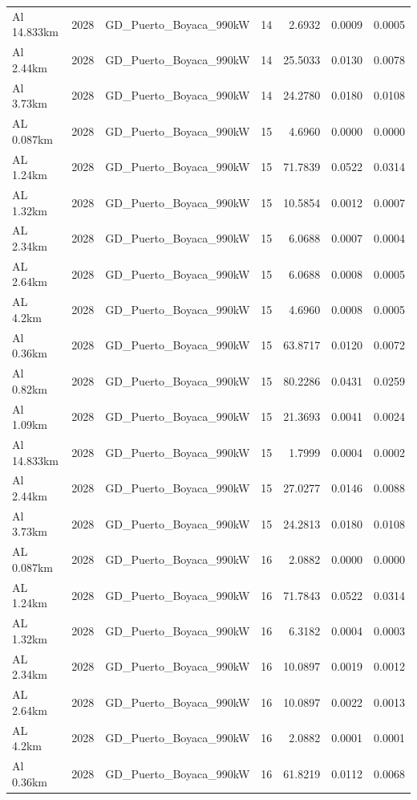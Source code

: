 \documentclass[11pt,a4paper]{article}
\begin{document}
\begin{longtable}{llllrrr}
Al 14.833km & 2028 & GD\_Puerto\_Boyaca\_990kW & 14 & 2.6932 & 0.0009 & 0.0005 \\
Al 2.44km & 2028 & GD\_Puerto\_Boyaca\_990kW & 14 & 25.5033 & 0.0130 & 0.0078 \\
Al 3.73km & 2028 & GD\_Puerto\_Boyaca\_990kW & 14 & 24.2780 & 0.0180 & 0.0108 \\
AL 0.087km & 2028 & GD\_Puerto\_Boyaca\_990kW & 15 & 4.6960 & 0.0000 & 0.0000 \\
AL 1.24km & 2028 & GD\_Puerto\_Boyaca\_990kW & 15 & 71.7839 & 0.0522 & 0.0314 \\
AL 1.32km & 2028 & GD\_Puerto\_Boyaca\_990kW & 15 & 10.5854 & 0.0012 & 0.0007 \\
AL 2.34km & 2028 & GD\_Puerto\_Boyaca\_990kW & 15 & 6.0688 & 0.0007 & 0.0004 \\
AL 2.64km & 2028 & GD\_Puerto\_Boyaca\_990kW & 15 & 6.0688 & 0.0008 & 0.0005 \\
AL 4.2km & 2028 & GD\_Puerto\_Boyaca\_990kW & 15 & 4.6960 & 0.0008 & 0.0005 \\
Al 0.36km & 2028 & GD\_Puerto\_Boyaca\_990kW & 15 & 63.8717 & 0.0120 & 0.0072 \\
Al 0.82km & 2028 & GD\_Puerto\_Boyaca\_990kW & 15 & 80.2286 & 0.0431 & 0.0259 \\
Al 1.09km & 2028 & GD\_Puerto\_Boyaca\_990kW & 15 & 21.3693 & 0.0041 & 0.0024 \\
Al 14.833km & 2028 & GD\_Puerto\_Boyaca\_990kW & 15 & 1.7999 & 0.0004 & 0.0002 \\
Al 2.44km & 2028 & GD\_Puerto\_Boyaca\_990kW & 15 & 27.0277 & 0.0146 & 0.0088 \\
Al 3.73km & 2028 & GD\_Puerto\_Boyaca\_990kW & 15 & 24.2813 & 0.0180 & 0.0108 \\
AL 0.087km & 2028 & GD\_Puerto\_Boyaca\_990kW & 16 & 2.0882 & 0.0000 & 0.0000 \\
AL 1.24km & 2028 & GD\_Puerto\_Boyaca\_990kW & 16 & 71.7843 & 0.0522 & 0.0314 \\
AL 1.32km & 2028 & GD\_Puerto\_Boyaca\_990kW & 16 & 6.3182 & 0.0004 & 0.0003 \\
AL 2.34km & 2028 & GD\_Puerto\_Boyaca\_990kW & 16 & 10.0897 & 0.0019 & 0.0012 \\
AL 2.64km & 2028 & GD\_Puerto\_Boyaca\_990kW & 16 & 10.0897 & 0.0022 & 0.0013 \\
AL 4.2km & 2028 & GD\_Puerto\_Boyaca\_990kW & 16 & 2.0882 & 0.0001 & 0.0001 \\
Al 0.36km & 2028 & GD\_Puerto\_Boyaca\_990kW & 16 & 61.8219 & 0.0112 & 0.0068 \\

\end{longtable}
\end{document}
